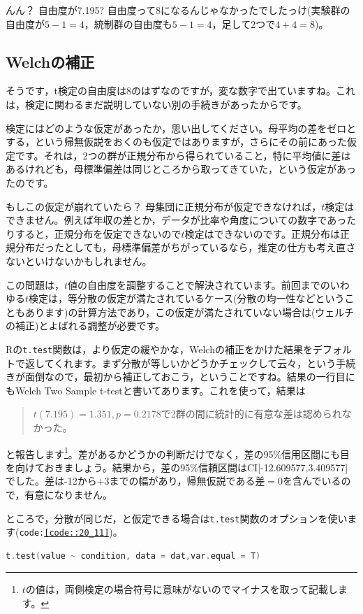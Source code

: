 \documentclass{ltjsbook}
\begin{document}
んん？ 自由度が7.195? 自由度って8になるんじゃなかったでしたっけ(実験群の自由度が$5-1=4$，統制群の自由度も$5-1=4$，足して2つで$4+4=8$)。

\subsection{Welchの補正}
そうです，t検定の自由度は$8$のはずなのですが，変な数字で出ていますね。これは，検定に関わるまだ説明していない別の手続きがあったからです。

検定にはどのような仮定があったか，思い出してください。母平均の差をゼロとする，という帰無仮説をおくのも仮定ではありますが，さらにその前にあった仮定です。それは，2つの群が正規分布から得られていること，特に平均値に差はあるけれども，母標準偏差は同じところから取ってきていた，という仮定があったのです。

もしこの仮定が崩れていたら？ 母集団に正規分布が仮定できなければ，$t$検定はできません。例えば年収の差とか，データが比率や角度についての数字であったりすると，正規分布を仮定できないので$t$検定はできないのです。正規分布は正規分布だったとしても，母標準偏差がちがっているなら，推定の仕方も考え直さないといけないかもしれません。

この問題は，$t$値の自由度を調整することで解決されています。前回までのいわゆる$t$検定は，等分散の仮定が満たされているケース(分散の均一性などということもあります)の計算方法であり，この仮定が満たされていない場合は(ウェルチの補正)とよばれる調整が必要です。

Rの\texttt{t.test}関数は，より仮定の緩やかな，Welchの補正をかけた結果をデフォルトで返してくれます。まず分散が等しいかどうかチェックして云々，という手続きが面倒なので，最初から補正しておこう，ということですね。結果の一行目にもWelch Two Sample t-testと書いてあります。これを使って，結果は
\begin{quote}
    $t(7.195)=1.351,p = 0.2178$で2群の間に統計的に有意な差は認められなかった。
\end{quote}
と報告します\footnote{$t$の値は，両側検定の場合符号に意味がないのでマイナスを取って記載します。}。差があるかどうかの判断だけでなく，差の95\%信用区間にも目を向けておきましょう。結果から，差の95\%信頼区間はCI[-12.609577,3.409577]でした。差は-12から+3までの幅があり，帰無仮説である差$=0$を含んでいるので，有意になりません。


ところで，分散が同じだ，と仮定できる場合は\texttt{t.test}関数のオプションを使います(\texttt{code:\ref{code::20_11}})。

\begin{lstlisting}[language=c++,label={code::20_11},caption={分散のオプション指定}]
t.test(value ~ condition, data = dat,var.equal = T)
\end{lstlisting}
\end{document}
